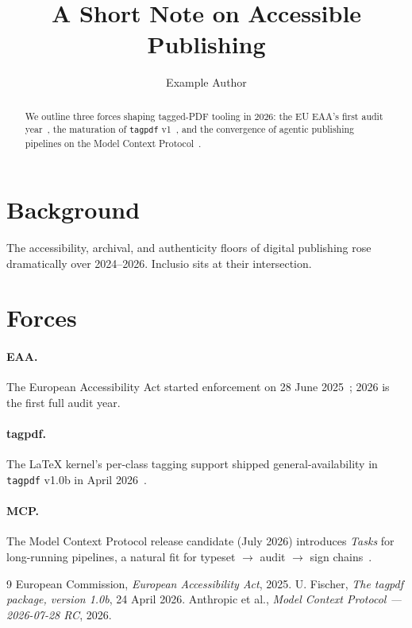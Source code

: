 \documentclass[final,tagged]{pub-paper}
\title{A Short Note on Accessible Publishing}
\author{Example Author}
\begin{document}
\maketitle

\begin{abstract}
We outline three forces shaping tagged-PDF tooling in 2026: the EU
EAA's first audit year~\cite{eaa-2025}, the maturation of
\texttt{tagpdf} v1~\cite{tagpdf-v1}, and the convergence of agentic
publishing pipelines on the Model Context Protocol~\cite{mcp-2026}.
\end{abstract}

\section{Background}

The accessibility, archival, and authenticity floors of digital
publishing rose dramatically over 2024--2026. Inclusio sits at
their intersection.

\section{Forces}

\paragraph{EAA.} The European Accessibility Act started enforcement
on 28 June 2025~\cite{eaa-2025}; 2026 is the first full audit year.

\paragraph{tagpdf.} The LaTeX kernel's per-class tagging support
shipped general-availability in \texttt{tagpdf} v1.0b in April
2026~\cite{tagpdf-v1}.

\paragraph{MCP.} The Model Context Protocol release candidate
(July 2026) introduces \emph{Tasks} for long-running pipelines, a
natural fit for typeset $\rightarrow$ audit $\rightarrow$ sign
chains~\cite{mcp-2026}.

\begin{thebibliography}{9}
   European Commission,
  \emph{European Accessibility Act}, 2025.
   U. Fischer, \emph{The tagpdf package, version
  1.0b}, 24 April 2026.
   Anthropic et al.,
  \emph{Model Context Protocol — 2026-07-28 RC}, 2026.
\end{thebibliography}
\end{document}
